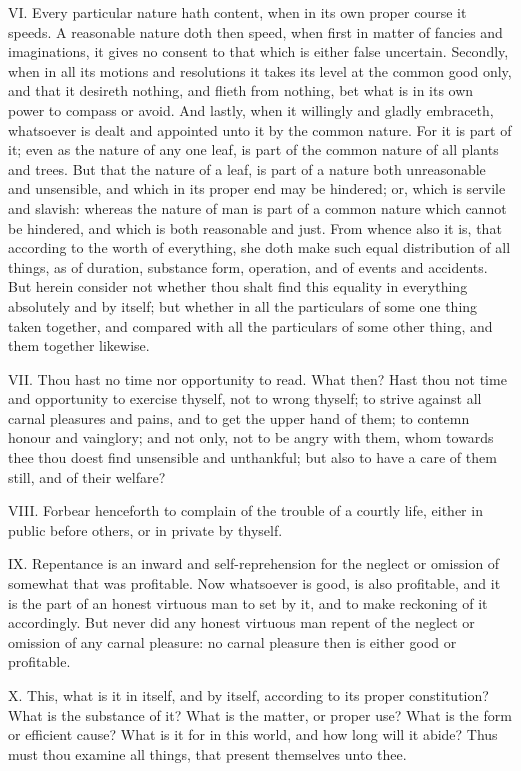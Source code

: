 VI. Every particular nature hath content, when in its own proper course
it speeds. A reasonable nature doth then speed, when first in matter of
fancies and imaginations, it gives no consent to that which is either
false uncertain. Secondly, when in all its motions and resolutions it
takes its level at the common good only, and that it desireth nothing, and
flieth from nothing, bet what is in its own power to compass or avoid. And
lastly, when it willingly and gladly embraceth, whatsoever is dealt and
appointed unto it by the common nature. For it is part of it; even as the
nature of any one leaf, is part of the common nature of all plants and
trees. But that the nature of a leaf, is part of a nature both
unreasonable and unsensible, and which in its proper end may be hindered;
or, which is servile and slavish: whereas the nature of man is part of a
common nature which cannot be hindered, and which is both reasonable and
just. From whence also it is, that according to the worth of everything,
she doth make such equal distribution of all things, as of duration,
substance form, operation, and of events and accidents. But herein
consider not whether thou shalt find this equality in everything
absolutely and by itself; but whether in all the particulars of some one
thing taken together, and compared with all the particulars of some other
thing, and them together likewise.

VII. Thou hast no time nor opportunity to read. What then? Hast thou
not time and opportunity to exercise thyself, not to wrong thyself; to
strive against all carnal pleasures and pains, and to get the upper hand
of them; to contemn honour and vainglory; and not only, not to be angry
with them, whom towards thee thou doest find unsensible and unthankful;
but also to have a care of them still, and of their welfare?

VIII. Forbear henceforth to complain of the trouble of a courtly life,
either in public before others, or in private by thyself.

IX. Repentance is an inward and self-reprehension for the neglect or
omission of somewhat that was profitable. Now whatsoever is good, is also
profitable, and it is the part of an honest virtuous man to set by it, and
to make reckoning of it accordingly. But never did any honest virtuous man
repent of the neglect or omission of any carnal pleasure: no carnal
pleasure then is either good or profitable.

X. This, what is it in itself, and by itself, according to its proper
constitution? What is the substance of it? What is the matter, or proper
use? What is the form or efficient cause? What is it for in this world,
and how long will it abide? Thus must thou examine all things, that
present themselves unto thee.


